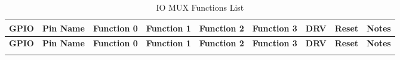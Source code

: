 
   \begin{longtable}[c]{|p{0.7cm}|p{1.9cm}|p{1.9cm}|p{1.9cm}|p{1.9cm}|p{1.9cm}|p{1cm}|p{1cm}|p{1.2cm}| }
   \caption{IO MUX Functions List}
    \label{table:iomux_pads} \\
        \hline
        \rowcolor{lightgray}
\textbf{GPIO} & \textbf{Pin Name} & \textbf{Function 0} & \textbf{Function 1} & \textbf{Function 2} & \textbf{Function 3} & \textbf{DRV} & \textbf{Reset} & \textbf{Notes} \\
 \hline
\endfirsthead
        \hline
        \rowcolor{lightgray}
        \textbf{GPIO} & \textbf{Pin Name} & \textbf{Function 0} & \textbf{Function 1} & \textbf{Function 2} & \textbf{Function 3} & \textbf{DRV} & \textbf{Reset} & \textbf{Notes} \\
        \hline
        \endhead
        \endfoot


\end{longtable}
